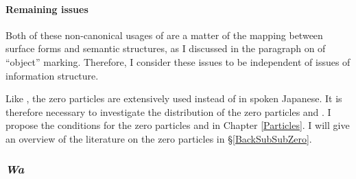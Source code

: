 %
%

\paragraph{Remaining issues}

Both of these non-canonical usages of  are a matter of the mapping
between surface forms and semantic structures,
as I discussed in the paragraph on  of ``object'' marking.
Therefore, I consider these issues to be independent of
issues of information structure.

Like ,
the zero particles are extensively used instead of  in spoken Japanese.
It is therefore necessary to investigate the distribution of the zero particles and .
I propose the conditions for the zero particles and  in Chapter \ref{Particles}.
I will give an overview of the literature on the zero particles in \S \ref{BackSubSubZero}.




\subsubsection{\textit{Wa}}\label{Back:GeneralChar:Wa}



